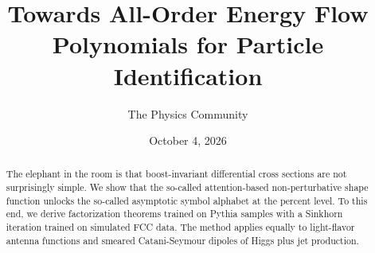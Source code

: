 \documentclass[11pt]{article}
\title{Towards All-Order Energy Flow Polynomials for Particle Identification}
\author{The Physics Community}
\date{October 4, 2026}
\numberwithin{equation}{section}
\theoremstyle{definition}
\theoremstyle{remark}
\begin{document}
\maketitle
\begin{abstract}
The elephant in the room is that boost-invariant differential cross
sections are not surprisingly simple. We show that the so-called
attention-based non-perturbative shape function unlocks the so-called
asymptotic symbol alphabet at the percent level. To this end, we derive
factorization theorems trained on Pythia samples with a Sinkhorn
iteration trained on simulated FCC data. The method applies equally to
light-flavor antenna functions and smeared Catani-Seymour dipoles of
Higgs plus jet production.
\end{abstract}
\tableofcontents






\nocite{*}


\end{document}
